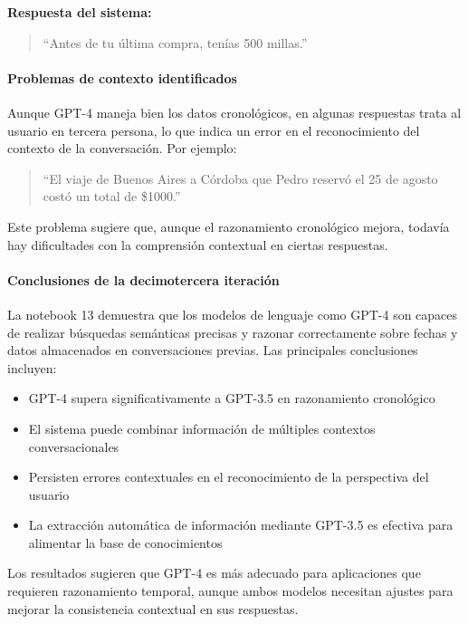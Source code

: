 \textbf{Respuesta del sistema:}
\begin{quote}
``Antes de tu última compra, tenías 500 millas.''
\end{quote}

\paragraph{Problemas de contexto identificados}

Aunque GPT-4 maneja bien los datos cronológicos, en algunas respuestas trata al usuario en tercera persona, lo que indica un error en el reconocimiento del contexto de la conversación. Por ejemplo:

\begin{quote}
``El viaje de Buenos Aires a Córdoba que Pedro reservó el 25 de agosto costó un total de \$1000.''
\end{quote}

Este problema sugiere que, aunque el razonamiento cronológico mejora, todavía hay dificultades con la comprensión contextual en ciertas respuestas.

\paragraph{Conclusiones de la decimotercera iteración}

La notebook 13 demuestra que los modelos de lenguaje como GPT-4 son capaces de realizar búsquedas semánticas precisas y razonar correctamente sobre fechas y datos almacenados en conversaciones previas. Las principales conclusiones incluyen:

\begin{itemize}
    \item GPT-4 supera significativamente a GPT-3.5 en razonamiento cronológico
    \item El sistema puede combinar información de múltiples contextos conversacionales
    \item Persisten errores contextuales en el reconocimiento de la perspectiva del usuario
    \item La extracción automática de información mediante GPT-3.5 es efectiva para alimentar la base de conocimientos
\end{itemize}

Los resultados sugieren que GPT-4 es más adecuado para aplicaciones que requieren razonamiento temporal, aunque ambos modelos necesitan ajustes para mejorar la consistencia contextual en sus respuestas. 